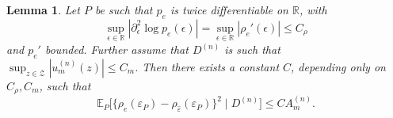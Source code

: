 \documentclass[aos]{imsart}
\newcommand{\R}{\mathbb{R}}
\newcommand{\E}{\mathbb{E}}
\newtheorem{lemma}[theorem]{Lemma}
\begin{document}
	
	
	
	
	
	\begin{lemma}
		\label{lem:estimatedresidualscore_locationonly}
		Let $P$ be such that $p_{e}$ is twice differentiable on $\R$, with \begin{equation*}
			\sup_{\epsilon\in\R} |\partial_\epsilon^2 \log p_{e}(\epsilon)| = \sup_{\epsilon\in\R} |\rho_{e}'(\epsilon)|\leq C_\rho
		\end{equation*}
		and $p_{e}'$ bounded. Further assume that $D^{(n)}$ is such that  $\sup_{z\in\mathcal{Z}} |u_m^{(n)}(z)|\leq C_m$. Then there exists a constant $C$, depending only on $C_\rho, C_m$, such that
		\begin{equation*}
			\E_P\Big[\big\{\rho_{e}(\varepsilon_P)-\rho_{\hat\varepsilon}(\varepsilon_P)\big\}^2 \; \Big| \; D^{(n)}\Big] \leq C A_m^{(n)} .
		\end{equation*}
	\end{lemma}
\end{document}
